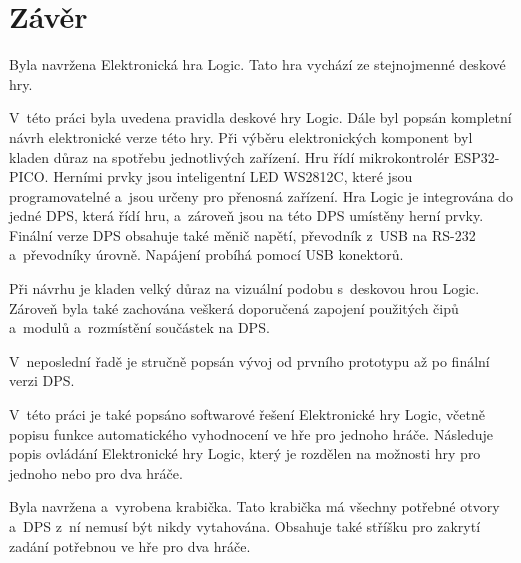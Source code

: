 \chapter*{Závěr}
{}

Byla navržena Elektronická hra Logic. Tato hra vychází ze stejnojmenné deskové hry.

V~této práci byla uvedena pravidla deskové hry Logic. Dále byl popsán kompletní návrh elektronické verze této hry. Při výběru elektronických 
komponent byl kladen důraz na spotřebu jednotlivých zařízení. Hru řídí mikrokontrolér ESP32-PICO. Herními prvky jsou inteligentní LED WS2812C, 
které jsou programovatelné a~jsou určeny pro přenosná zařízení. Hra Logic je integrována do jedné DPS, která řídí hru, a~zároveň jsou na této 
DPS umístěny herní prvky. Finální verze DPS obsahuje také měnič napětí, převodník z~USB na RS-232 a~převodníky úrovně. Napájení probíhá pomocí
USB konektorů.

Při návrhu je kladen velký důraz na vizuální podobu s~deskovou hrou Logic. Zároveň byla také zachována veškerá doporučená zapojení použitých 
čipů a~modulů a~rozmístění součástek na DPS.

V~neposlední řadě je stručně popsán vývoj od prvního prototypu až po finální verzi DPS. 

V~této práci je také popsáno softwarové řešení Elektronické hry Logic, včetně popisu funkce automatického vyhodnocení ve hře pro jednoho hráče.
Následuje popis ovládání Elektronické hry Logic, který je rozdělen na možnosti hry pro jednoho nebo pro dva hráče. 

Byla navržena a~vyrobena krabička. Tato krabička má všechny potřebné otvory a~DPS z~ní nemusí být nikdy vytahována. Obsahuje také stříšku pro
zakrytí zadání potřebnou ve hře pro dva hráče. 